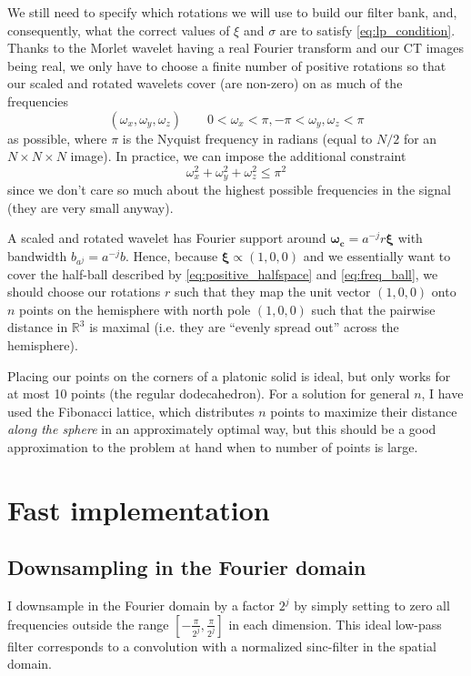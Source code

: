 \documentclass[twocolumn, openany, oneside, article]{memoir}
\begin{document}
We still need to specify which rotations we will use to build our filter bank, and, consequently, what the correct
values of $\xi$ and $\sigma$ are to satisfy \autoref{eq:lp_condition}. Thanks to the Morlet wavelet having a real
Fourier transform and our CT images being real, we only have to choose a finite number of positive rotations so that our
scaled and rotated wavelets cover (are non-zero) on as much of the frequencies
\begin{equation}\label{eq:positive_halfspace}
(\omega_x, \omega_y, \omega_z) \qquad 0 < \omega_x < \pi, -\pi < \omega_y, \omega_z < \pi
\end{equation}
as possible, where $\pi$ is the Nyquist frequency in radians (equal to $N/2$ for an $N \times N \times N$ image). In practice, we can
impose the additional constraint
\begin{equation}\label{eq:freq_ball}
    \omega_{x}^2 + \omega_{y}^2 + \omega_{z}^2 \leq \pi^2
\end{equation}
since we don't care so much about the highest possible frequencies in the signal (they are very small anyway).

A scaled and rotated wavelet has Fourier support around $\bm{\omega_c} = a^{-j}r\bm{\xi}$ with bandwidth $b_{a^j} =
a^{-j}b$. Hence, because $\bm{\xi} \propto (1, 0, 0)$ and we essentially want to cover the half-ball described by
\autoref{eq:positive_halfspace} and \autoref{eq:freq_ball}, we should choose our rotations $r$ such that they map the
unit vector $(1, 0, 0)$ onto $n$ points on the hemisphere with north pole $(1, 0, 0)$ such that the pairwise distance in
$\mathbb{R}^3$ is maximal (i.e. they are \enquote{evenly spread out} across the hemisphere).

Placing our points on the corners of a platonic solid is ideal, but only works for at most 10 points (the regular
dodecahedron). For a solution for general $n$, I have used the Fibonacci lattice, which distributes $n$ points to
maximize their distance \emph{along the sphere} in an approximately optimal way, but this should be a good approximation
to the problem at hand when to number of points is large.



\appendix

\chapter{Fast implementation}

\section{Downsampling in the Fourier domain}
I downsample in the Fourier domain by a factor $2^j$ by simply setting to zero all frequencies
outside the range $[-\frac{\pi}{2^j}, \frac{\pi}{2^j}]$ in each dimension. This ideal low-pass filter corresponds to a
convolution with a normalized sinc-filter in the spatial domain.
\end{document}
